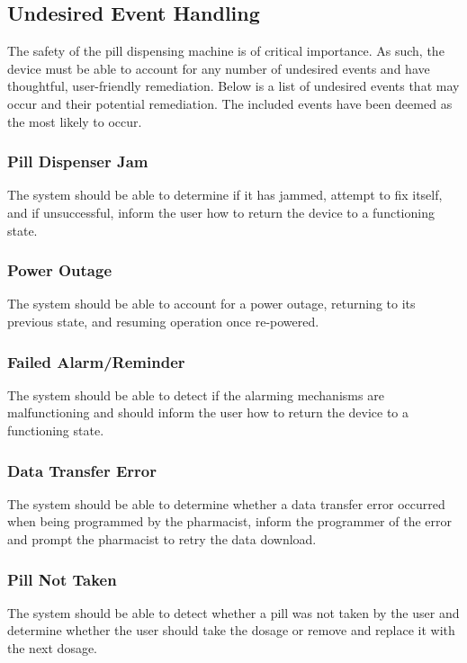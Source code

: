 \documentclass[12pt,titlepage]{article}
\begin{document}
\subsection{Undesired Event Handling}
The safety of the pill dispensing machine is of critical importance. As such, the device must be able to account for any number of undesired events and have thoughtful, user-friendly remediation. Below is a list of undesired events that may occur and their potential remediation. The included events have been deemed as the most likely to occur.
\subsubsection{Pill Dispenser Jam}
The system should be able to determine if it has jammed, attempt to fix itself, and if unsuccessful, inform the user how to return the device to a functioning state.
\subsubsection{Power Outage}
The system should be able to account for a power outage, returning to its previous state, and resuming operation once re-powered.
\subsubsection{Failed Alarm/Reminder}
The system should be able to detect if the alarming mechanisms are malfunctioning and should inform the user how to return the device to a functioning state.
\subsubsection{Data Transfer Error}
The system should be able to determine whether a data transfer error occurred when being programmed by the pharmacist, inform the programmer of the error and prompt the pharmacist to retry the data download.
\subsubsection{Pill Not Taken}
The system should be able to detect whether a pill was not taken by the user and determine whether the user should take the dosage or remove and replace it with the next dosage.
\end{document}
